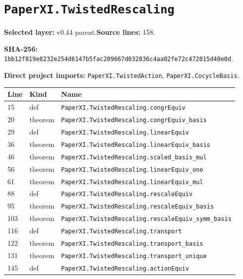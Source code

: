 \documentclass[10pt,oneside]{book}
\begin{document}
\section{\texorpdfstring{\nolinkurl{PaperXI.TwistedRescaling}}{PaperXI.TwistedRescaling}}\label{module:PaperXI.TwistedRescaling}

\textbf{Selected layer:} v0.44 parent.\quad\textbf{Source lines:} 158.\par\textbf{SHA-256:} {\scriptsize\nolinkurl{1bb12f819e8232e254d6147b5fac209667d032836c4aa02fe72c472015d40e0d}}.


\textbf{Direct project imports:} \nolinkurl{PaperXI.TwistedAction}, \nolinkurl{PaperXI.CocycleBasis}.

\begin{longtable}{@{}p{}p{}p{}@{}}\toprule Line&Kind&Name\\\midrule\endhead

15&def&\nolinkurl{PaperXI.TwistedRescaling.congrEquiv}\\

20&theorem&\nolinkurl{PaperXI.TwistedRescaling.congrEquiv_basis}\\

29&def&\nolinkurl{PaperXI.TwistedRescaling.linearEquiv}\\

36&theorem&\nolinkurl{PaperXI.TwistedRescaling.linearEquiv_basis}\\

46&theorem&\nolinkurl{PaperXI.TwistedRescaling.scaled_basis_mul}\\

56&theorem&\nolinkurl{PaperXI.TwistedRescaling.linearEquiv_one}\\

61&theorem&\nolinkurl{PaperXI.TwistedRescaling.linearEquiv_mul}\\

88&def&\nolinkurl{PaperXI.TwistedRescaling.rescaleEquiv}\\

95&theorem&\nolinkurl{PaperXI.TwistedRescaling.rescaleEquiv_basis}\\

103&theorem&\nolinkurl{PaperXI.TwistedRescaling.rescaleEquiv_symm_basis}\\

116&def&\nolinkurl{PaperXI.TwistedRescaling.transport}\\

122&theorem&\nolinkurl{PaperXI.TwistedRescaling.transport_basis}\\

131&theorem&\nolinkurl{PaperXI.TwistedRescaling.transport_unique}\\

145&def&\nolinkurl{PaperXI.TwistedRescaling.actionEquiv}\\

\bottomrule\end{longtable}
\end{document}
